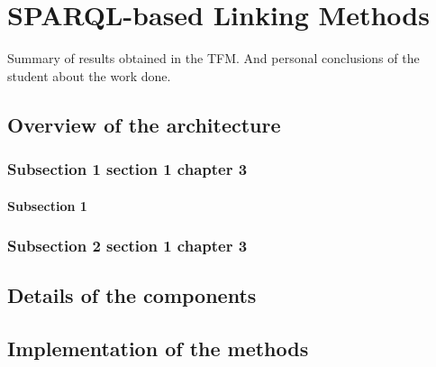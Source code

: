 \chapter{SPARQL-based Linking Methods}

Summary of results obtained in the TFM. And personal conclusions of the student about the work done.


\section{Overview of the architecture}

\subsection{Subsection 1 section 1 chapter 3}

\subsubsection{Subsection 1}

\subsection{Subsection 2 section 1 chapter 3}

\section{Details of the components}
\section{Implementation of the methods}
